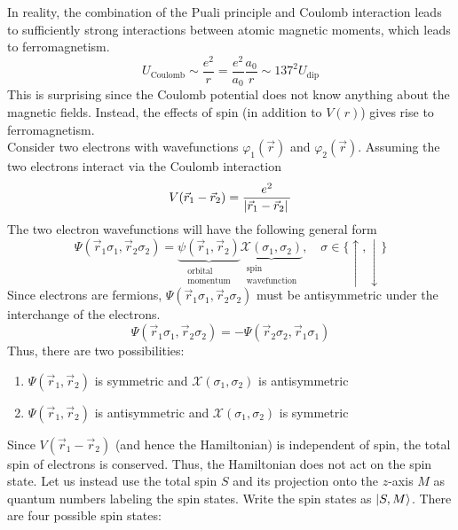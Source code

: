 \documentclass[12pt,a4paper,titlepage]{article}
\newcommand{\trm}[1]{\textrm{#1}} %
\newcommand{\up}{\uparrow} %
\newcommand{\dn}{\downarrow} %
\newcommand{\Chi}{\mathcal{X}} %
\begin{document}
In reality, the combination of the Puali principle and Coulomb interaction leads to sufficiently strong interactions between atomic magnetic moments, which leads to ferromagnetism.
\begin{equation}
U_{\trm{Coulomb}}\sim \frac{e^{2}}{r}=\frac{e^{2}}{a_{0}}\frac{a_{0}}{r}\sim 137^{2}U_{\trm{dip}}
\end{equation}
This is surprising since the Coulomb potential does not know anything about the magnetic fields. Instead, the effects of spin (in addition to $V(r)$) gives rise to ferromagnetism.\\

Consider two electrons with wavefunctions $\varphi_{1}(\vec{r})$ and $\varphi_{2}(\vec{r})$. Assuming the two electrons interact via the Coulomb interaction
\begin{equation}
V(\vec{r}_{1}-\vec{r}_{2})=\frac{e^{2}}{\abs*{\vec{r}_{1}-\vec{r}_{2}}}
\end{equation}
The two electron wavefunctions will have the following general form
\begin{equation}
\Psi(\vec{r}_{1}\sigma_{1},\vec{r}_{2}\sigma_{2})=\underbrace{\psi(\vec{r}_{1},\vec{r}_{2})}_{\substack{\trm{orbital}\\\trm{momentum}}}\underbrace{\Chi(\sigma_{1},\sigma_{2})}_{\substack{\trm{spin}\\\trm{wavefunction}}},\quad\sigma\in\{\up,\dn\}
\end{equation}
Since electrons are fermions, $\Psi(\vec{r}_{1}\sigma_{1},\vec{r}_{2}\sigma_{2})$ must be antisymmetric under the interchange of the electrons.
\begin{equation}
\Psi(\vec{r}_{1}\sigma_{1},\vec{r}_{2}\sigma_{2})=-\Psi(\vec{r}_{2}\sigma_{2},\vec{r}_{1}\sigma_{1})
\end{equation}
Thus, there are two possibilities:
\begin{enumerate}
\item $\Psi(\vec{r}_{1},\vec{r}_{2})$ is symmetric and $\Chi(\sigma_{1},\sigma_{2})$ is antisymmetric
\item $\Psi(\vec{r}_{1},\vec{r}_{2})$ is antisymmetric and $\Chi(\sigma_{1},\sigma_{2})$ is symmetric
\end{enumerate}
Since $V(\vec{r}_{1}-\vec{r}_{2})$ (and hence the Hamiltonian) is independent of spin, the total spin of electrons is conserved. Thus, the Hamiltonian does not act on the spin state. Let us instead use the total spin $S$ and its projection onto the $z$-axis $M$ as quantum numbers labeling the spin states. Write the spin states as $\ket{S,M}$. There are four possible spin states:
\end{document}
